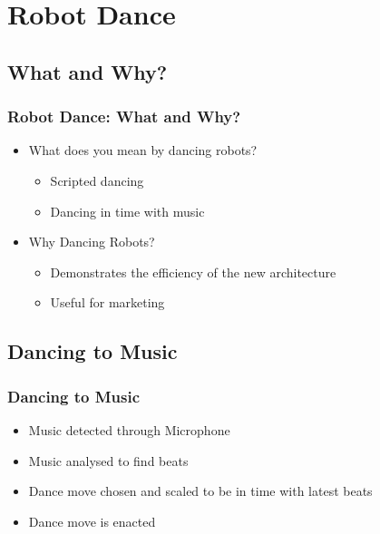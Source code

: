 \documentclass{beamer}
\begin{document}
\section{Robot Dance}
	\begin{frame}
		\sectionpage %
	\end{frame}
	\subsection{What and Why?} %
	\begin{frame}
		\frametitle{Robot Dance: What and Why?}
		\begin{itemize}
			\item What does you mean by dancing robots?
			\begin{itemize}
				\item Scripted dancing
				\item Dancing in time with music
			\end{itemize}
			\item Why Dancing Robots?
			\begin{itemize}
				\item Demonstrates the efficiency of the new architecture
				\item Useful for marketing
			\end{itemize}
		\end{itemize}
	\end{frame}
	\subsection{Dancing to Music} %
	\begin{frame}
		\frametitle{Dancing to Music}
		\begin{itemize}
			\item Music detected through Microphone
			\item Music analysed to find beats
			\item Dance move chosen and scaled to be in time with latest beats
			\item Dance move is enacted
		\end{itemize}
	\end{frame}	
\end{document}
